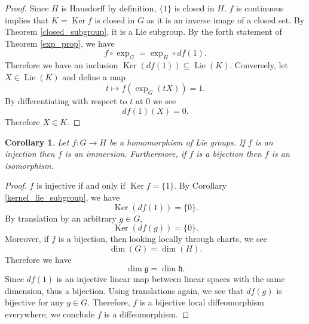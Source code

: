 \documentclass{article}
\newtheorem{corollary}{Corollary}[section]
\numberwithin{equation}{section}
\DeclareMathOperator{\Ker}{Ker}
\DeclareMathOperator{\Lie}{Lie}
\begin{document}
\begin{proof}
Since $H$ is Hausdorff by definition, $\{1\}$ is closed in $H$. $f$ is continuous implies that $K=\Ker f$ is closed in $G$ as it is an inverse image of a closed set. By Theorem \ref{closed_subgroup}, it is a Lie subgroup. By the forth statement of Theorem \ref{exp_prop}, we have
\begin{equation*}
f\circ\exp_G = \exp_H\circ df(1).
\end{equation*}
Therefore we have an inclusion $\Ker(df(1))\subseteq\Lie(K)$. Conversely, let $X\in\Lie(K)$ and define a map
\begin{equation*}
t\mapsto f(\exp_G(tX))=1.
\end{equation*}
By differentiating with respect to $t$ at $0$ we see
\begin{equation*}
df(1)(X) = 0.
\end{equation*}
Therefore $X\in K$.
\end{proof}

\begin{corollary}
Let $f:G\to H$ be a homomorphism of Lie groups. If $f$ is an injection then $f$ is an immersion. Furthermore, if $f$ is a bijection then $f$ is an isomorphism.
\end{corollary}

\begin{proof}
$f$ is injective if and only if $\Ker f=\{1\}$. By Corollary \ref{kernel_lie_subgroup}, we have 
\begin{equation*}
\Ker(df(1))=\{0\}.
\end{equation*}
By translation by an arbitrary $g\in G$, %
\begin{equation*}
\Ker(df(g))=\{0\}.
\end{equation*}
Moreover, if $f$ is a bijection, then looking locally through charts, we see %
\begin{equation*}
\dim(G) = \dim(H).
\end{equation*}
Therefore we have
\begin{equation*}
\dim\mathfrak{g}=\dim\mathfrak{h}.
\end{equation*}
Since $df(1)$ is an injective linear map between linear spaces with the same dimension, thus a bijection. Using translations again, we see that $df(g)$ is bijective for any $g\in G$.%
Therefore, $f$ is a bijective local diffeomorphism everywhere, we conclude $f$ is a diffeomorphism. %
\end{proof}
\end{document}

